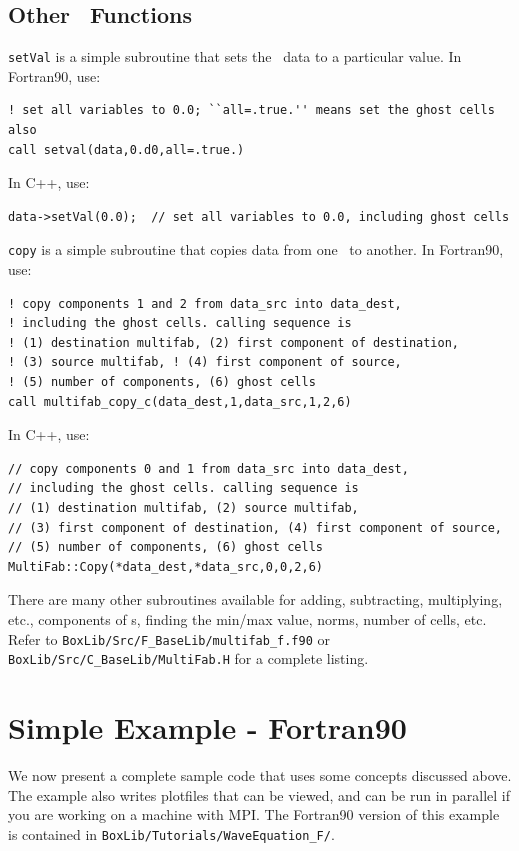 \subsection{Other \MultiFab\ Functions}
{\tt setVal} is a simple subroutine that sets the \MultiFab\ data to a particular value.
In Fortran90, use:
\begin{lstlisting}[backgroundcolor=\color{light-green}]
! set all variables to 0.0; ``all=.true.'' means set the ghost cells also
call setval(data,0.d0,all=.true.)
\end{lstlisting}
In C++, use:
\begin{lstlisting}[backgroundcolor=\color{light-blue}]
data->setVal(0.0);  // set all variables to 0.0, including ghost cells
\end{lstlisting}
{\tt copy} is a simple subroutine that copies data from one \MultiFab\ to another.
In Fortran90, use:
\begin{lstlisting}[backgroundcolor=\color{light-green}]
! copy components 1 and 2 from data_src into data_dest, 
! including the ghost cells. calling sequence is 
! (1) destination multifab, (2) first component of destination, 
! (3) source multifab, ! (4) first component of source, 
! (5) number of components, (6) ghost cells
call multifab_copy_c(data_dest,1,data_src,1,2,6)
\end{lstlisting}
In C++, use:
\begin{lstlisting}[backgroundcolor=\color{light-blue}]
// copy components 0 and 1 from data_src into data_dest, 
// including the ghost cells. calling sequence is 
// (1) destination multifab, (2) source multifab, 
// (3) first component of destination, (4) first component of source, 
// (5) number of components, (6) ghost cells
MultiFab::Copy(*data_dest,*data_src,0,0,2,6)
\end{lstlisting}
There are many other subroutines available for adding, subtracting, multiplying, etc.,
components of \MultiFab s, finding the min/max value, norms, number of cells, etc.
Refer to {\tt BoxLib/Src/F\_BaseLib/multifab\_f.f90} or 
{\tt BoxLib/Src/C\_BaseLib/MultiFab.H} for a complete listing.

\section{Simple Example - Fortran90}
We now present a complete sample code that uses some concepts discussed above.
The example also writes plotfiles that can be viewed, and can be run in parallel if you
are working on a machine with MPI.  The Fortran90 version of this example is contained in 
{\tt BoxLib/Tutorials/WaveEquation\_F/}.\\

